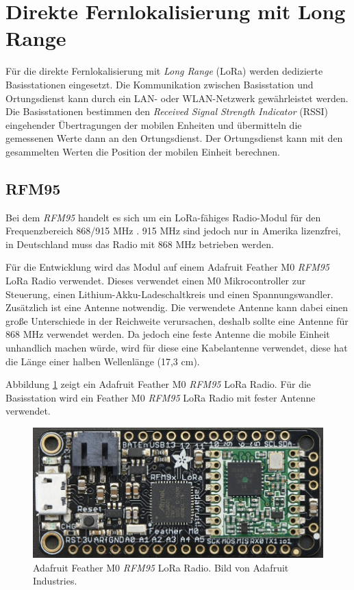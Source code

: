 \section{Direkte Fernlokalisierung mit Long Range}
\label{ch:phase4}
Für die direkte Fernlokalisierung mit \emph{Long Range} (LoRa) werden dedizierte Basisstationen eingesetzt. 
Die Kommunikation zwischen Basisstation und Ortungsdienst kann durch ein LAN- oder WLAN-Netzwerk gewährleistet werden.
Die Basisstationen bestimmen den \emph{Received Signal Strength Indicator} (RSSI) eingehender Übertragungen der mobilen Enheiten und übermitteln die gemessenen Werte dann an den Ortungsdienst.
Der Ortungsdienst kann mit den gesammelten Werten die Position der mobilen Einheit berechnen.

\subsection{RFM95}
\label{ch:hardwarechanges:sec:rfm95}
Bei dem \emph{RFM95} handelt es sich um ein LoRa-fähiges Radio-Modul für den Frequenzbereich 868/915 MHz \cite{hope2006rfm}. 
915 MHz sind jedoch nur in Amerika lizenzfrei, in Deutschland muss das Radio mit 868 MHz betrieben werden.

Für die Entwicklung wird das Modul auf einem Adafruit Feather M0 \emph{RFM95} LoRa Radio verwendet.
Dieses verwendet einen M0 Mikrocontroller zur Steuerung, einen Lithium-Akku-Ladeschaltkreis und einen Spannungswandler.
Zusätzlich ist eine Antenne notwendig. 
Die verwendete Antenne kann dabei einen große Unterschiede in der Reichweite verursachen, deshalb sollte eine Antenne für 868 MHz verwendet werden.
Da jedoch eine feste Antenne die mobile Einheit unhandlich machen würde, wird für diese eine Kabelantenne verwendet, diese hat die Länge einer halben Wellenlänge (17,3 cm).

Abbildung \ref{fig:lorafeather} zeigt ein Adafruit Feather M0 \emph{RFM95} LoRa Radio. 
Für die Basisstation wird ein Feather M0 \emph{RFM95} LoRa Radio mit fester Antenne verwendet.

\begin{figure}[h]
  \centering
	\includegraphics[width=\textwidth]{images/loraada.png}
  \caption{Adafruit Feather M0 \emph{RFM95} LoRa Radio. Bild von Adafruit Industries\protect \footnotemark.}
  \label{fig:lorafeather}
\end{figure}

